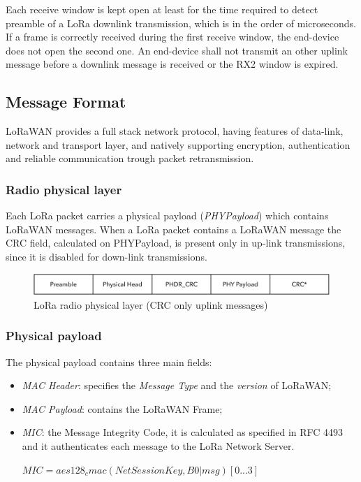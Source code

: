Each receive window is kept open at least for the time required to detect preamble of a LoRa downlink transmission, which is in the order of microseconds. If a frame is correctly received during the first receive window, the end-device does not open the second one. An end-device shall not transmit an other uplink message before a downlink message is received or the RX2 window is expired.


\subsection{Message Format}
LoRaWAN provides a full stack network protocol, having features of data-link, network and transport layer, and natively supporting encryption, authentication and reliable communication trough packet retransmission.

\subsubsection{Radio physical layer}

Each LoRa packet carries a physical payload (\emph{PHYPayload}) which contains LoRaWAN messages. When a LoRa packet contains a LoRaWAN message the CRC field, calculated on PHYPayload, is present only in up-link transmissions, since it is disabled for down-link transmissions.

\begin{figure}[h!]
\centering
\includegraphics[width=\textwidth]{img/msgformat/radio}
\caption{LoRa radio physical layer (CRC only uplink messages)}
\end{figure}


\subsubsection{Physical payload}

The physical payload contains three main fields:

\begin{itemize}

\item \emph{MAC Header}: specifies the \emph{Message Type} and the \emph{version} of LoRaWAN;

\item \emph{MAC Payload}: contains the LoRaWAN Frame;

\item \emph{MIC}: the Message Integrity Code, it is calculated as specified in RFC 4493 and it authenticates each message to the LoRa Network Server.

$MIC = aes128_cmac(NetSessionKey, B0 | msg) [0...3]$

\end{itemize}

